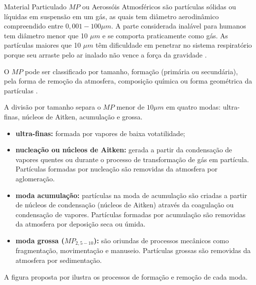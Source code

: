 Material Particulado $MP$ ou Aerossóis Atmosféricos são partículas
sólidas ou líquidas em suspensão em um gás, as quais tem diâmetro 
aerodinâmico compreendido  entre $0,001-100\mu m$. 
A parte considerada inalável para humanos tem diâmetro menor que 10 $\mu m$
e se comporta praticamente como gás.
As partículas maiores que 10 $\mu m$ têm dificuldade em penetrar 
no sistema respiratório porque seu arraste pelo ar inalado não vence 
a força da gravidade \citep{seinfeld1998}.

O $MP$ pode ser classificado por tamanho, formação 
(primária ou secundária), pela forma de remoção da atmosfera, 
composição química ou forma geométrica da partículas \citep{seinfeld1998}.

A divisão por tamanho separa o $MP$ menor de $10 \mu m$ em quatro modas:
ultra-finas, núcleos de Aitken, acumulação e grossa. 

\begin{itemize}
  \item \textbf{ultra-finas:} formada por vapores de baixa votatilidade;
  \item \textbf{nucleação ou núcleos de Aitken:} 
        gerada a partir da condensação de vapores quentes ou durante o processo de 
        transformação de gás em partícula. Partículas formadas por 
        nucleação são removidas da atmosfera por aglomeração.   
  \item \textbf{moda acumulação:} 
         partículas na moda de acumulação são criadas 
         a partir de núcleos de condensação (núcleos de Aitken) através da 
         coagulação ou condensação de vapores. 
         Partículas formadas por acumulação
         são removidas da atmosfera por deposição seca ou úmida.
  \item \textbf{moda grossa ($MP_{2,5-10}$):} 
        são oriundas de processos mecânicos como fragmentação, 
        movimentação e manuseio. Partículas grossas são removidas da atmosfera 
        por sedimentação.
\end{itemize}

A figura proposta por \citep{finlayson1999} ilustra os processos de 
formação e remoção de cada moda. 

